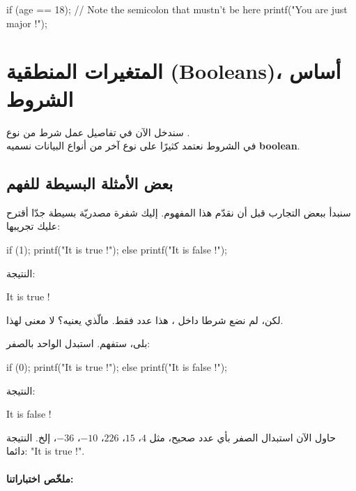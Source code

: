 \begin{Csource}
if (age == 18); // Note the semicolon that mustn't be here
{
	printf("You are just major !");
}
\end{Csource}

\section{المتغيرات المنطقية (\textenglish{Booleans})، أساس الشروط}
سندخل الآن في تفاصيل عمل شرط من نوع
.\\
في الشروط نعتمد كثيرًا على نوع آخر من أنواع البيانات نسميه \textbf{\textenglish{boolean}}.

\subsection{بعض الأمثلة البسيطة للفهم}

سنبدأ ببعض التجارب قبل أن نقدّم هذا المفهوم. إليك شفرة مصدريّة بسيطة جدّا أقترح عليك تجريبها:

\begin{Csource}
if (1);
{
	printf("It is true !");
}
else
{
	printf("It is false !");
}
\end{Csource}

النتيجة: 

\begin{Console}
It is true !
\end{Console}

\begin{question}
لكن، لم نضع شرطا داخل
،
هذا عدد فقط. مالّذي يعنيه؟ لا معنى لهذا.
\end{question}

بلى، ستفهم. استبدل الواحد بالصفر:

\begin{Csource}
if (0);
{
	printf("It is true !");
}
else
{
	printf("It is false !");
}
\end{Csource}

النتيجة:
\begin{Console}
It is false !
\end{Console}

حاول الآن استبدال الصفر بأي عدد صحيح، مثل $ 4 $، $ 15 $، $ 226 $، $ -10 $، $ -36 $، إلخ. النتيجة دائما:
"\textenglish{It is true !}".

\paragraph{ملخّص اختباراتنا:}


